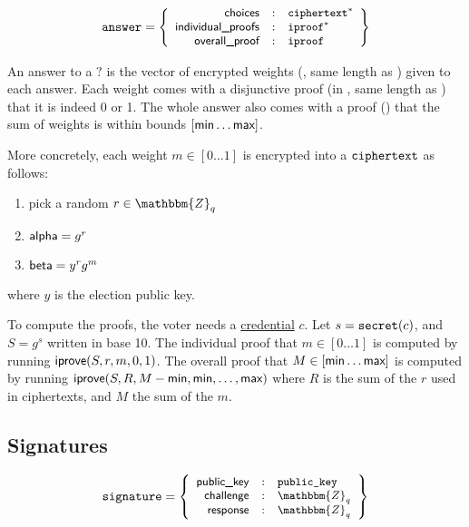 \documentclass[a4paper]{article}
\newcommand{\Z}{\mathbbm{Z}}
\begin{document}
\begin{gather*}
  \texttt{answer}=\left\{\small
    \begin{array}{rcl}
      \textsf{choices}&:&\texttt{ciphertext}^\ast\\
      \textsf{individual\_proofs}&:&\texttt{iproof}^\ast\\
      \textsf{overall\_proof}&:&\texttt{iproof}
    \end{array}
  \right\}
\end{gather*}

An answer to a \hyperref[elections]{$\question$} is the vector of
encrypted weights (\choices, same length as \answers) given to each
answer. Each weight comes with a disjunctive proof (in \iproofs, same
length as \choices) that it is indeed 0 or 1. The whole answer also
comes with a proof (\oproof) that the sum of weights is within bounds
$[\textsf{min}\dots\textsf{max}]$.

More concretely, each weight $m\in[0\dots1]$ is encrypted into a
$\texttt{ciphertext}$ as follows:
\begin{enumerate}
\item pick a random $r\in\Z_q$
\item $\textsf{alpha}=g^r$
\item $\textsf{beta}=y^rg^m$
\end{enumerate}
where $y$ is the election public key.

To compute the proofs, the voter needs a
\hyperref[credentials]{credential} $c$. Let $s=\texttt{secret}(c)$, and
$S=g^s$ written in base 10. The individual proof that $m\in[0\dots1]$
is computed by running $\textsf{iprove}(S,r,m,0,1)$.  The overall proof that
$M\in[\textsf{min}\dots\textsf{max}]$ is computed by running
$\textsf{iprove}(S,R,M-\textsf{min},\textsf{min},\dots,\textsf{max})$ where $R$ is the
sum of the $r$ used in ciphertexts, and $M$ the sum of the $m$.

\subsection{Signatures}
\label{signatures}

\begin{gather*}
  \signature=\left\{\small
    \begin{array}{rcl}
      \pklabel&:&\pk\\
      \challenge&:&\Z_q\\
      \response&:&\Z_q
    \end{array}
  \right\}
\end{gather*}

\newcommand{\siglabel}{\textsf{signature}}
\end{document}
